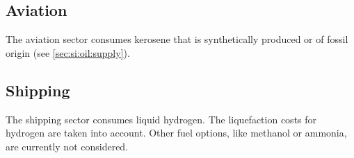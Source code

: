 \subsection{Aviation}
\label{sec:si:transport:aviation}

The aviation sector consumes kerosene that is synthetically produced or of
fossil origin (see \cref{sec:si:oil:supply}).

\subsection{Shipping}
\label{sec:si:transport:shipping}

The shipping sector consumes liquid hydrogen.
The liquefaction costs for hydrogen are taken into account.
Other fuel options, like methanol or ammonia, are currently not considered.